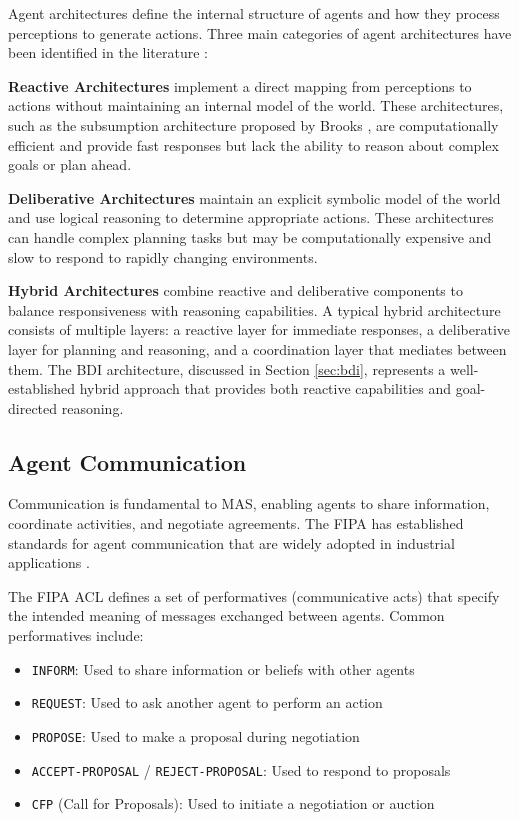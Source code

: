 Agent architectures define the internal structure of agents and how they process perceptions to generate actions. Three main categories of agent architectures have been identified in the literature \cite{wooldridge2009introduction}:

\textbf{Reactive Architectures} implement a direct mapping from perceptions to actions without maintaining an internal model of the world. These architectures, such as the subsumption architecture proposed by Brooks \cite{brooks1986robust}, are computationally efficient and provide fast responses but lack the ability to reason about complex goals or plan ahead.

\textbf{Deliberative Architectures} maintain an explicit symbolic model of the world and use logical reasoning to determine appropriate actions. These architectures can handle complex planning tasks but may be computationally expensive and slow to respond to rapidly changing environments.

\textbf{Hybrid Architectures} combine reactive and deliberative components to balance responsiveness with reasoning capabilities. A typical hybrid architecture consists of multiple layers: a reactive layer for immediate responses, a deliberative layer for planning and reasoning, and a coordination layer that mediates between them. The \ac{BDI} architecture, discussed in Section \ref{sec:bdi}, represents a well-established hybrid approach that provides both reactive capabilities and goal-directed reasoning.

\subsection{Agent Communication}
\label{subsec:agent_communication}

Communication is fundamental to \ac{MAS}, enabling agents to share information, coordinate activities, and negotiate agreements. The \ac{FIPA} has established standards for agent communication that are widely adopted in industrial applications \cite{fipa2002acl}.

The FIPA \ac{ACL} defines a set of performatives (communicative acts) that specify the intended meaning of messages exchanged between agents. Common performatives include:

\begin{itemize}
    \item \texttt{INFORM}: Used to share information or beliefs with other agents
    \item \texttt{REQUEST}: Used to ask another agent to perform an action
    \item \texttt{PROPOSE}: Used to make a proposal during negotiation
    \item \texttt{ACCEPT-PROPOSAL} / \texttt{REJECT-PROPOSAL}: Used to respond to proposals
    \item \texttt{CFP} (Call for Proposals): Used to initiate a negotiation or auction
\end{itemize}

